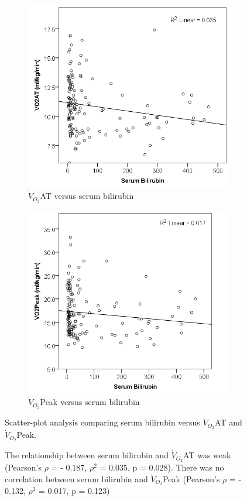 \begin{figure}[htbp]
	\centering
	\begin{subfigure}{0.48\textwidth}
		\centering
		\includegraphics[width=\textwidth]{Figures/cpet_oj_scatter_at_bil}
		\caption{$\dot{V}_{O_2}$AT versus serum bilirubin}
		\label{fig:cpet_oj_scatter_at_bil}
	\end{subfigure}
	\begin{subfigure}{0.48\textwidth}
		\centering
		\includegraphics[width=\textwidth]{Figures/cpet_oj_scatter_peak_bil}
		\caption{$\dot{V}_{O_2}$Peak versus serum bilirubin}
		\label{fig:cpet_oj_scatter_peak_bil}
	\end{subfigure}
	\caption{Scatter-plot analysis comparing serum bilirubin versus $\dot{V}_{O_2}$AT and $\dot{V}_{O_2}$Peak.}
	\label{fig:cpet_oj_scatter}
	\caption*{The relationship between serum bilirubin and $\dot{V}_{O_2}$AT was weak (Pearson's $\rho$ = - 0.187, $\rho^2$ = 0.035, p = 0.028). There was no correlation between serum bilirubin and $\dot{V}_{O_2}$Peak (Pearson's $\rho$ = - 0.132, $\rho^2$ = 0.017, p = 0.123)}
	

\end{figure}
